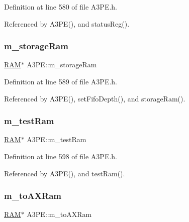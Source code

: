 Definition at line 580 of file A3\+P\+E.\+h.



Referenced by A3\+P\+E(), and status\+Reg().

\mbox{\label{classA3PE_a41e317474e0c6e63bad4648903279be9}} 
\subsubsection{\texorpdfstring{m\+\_\+storage\+Ram}{m\_storageRam}}
{\footnotesize\ttfamily \hyperlink{classRAM}{R\+AM}$\ast$ A3\+P\+E\+::m\+\_\+storage\+Ram\hspace{0.3cm}{\ttfamily [private]}}



Definition at line 589 of file A3\+P\+E.\+h.



Referenced by A3\+P\+E(), set\+Fifo\+Depth(), and storage\+Ram().

\mbox{\label{classA3PE_ad788e41ef5c674ab1a7671f3db0ffef6}} 
\subsubsection{\texorpdfstring{m\+\_\+test\+Ram}{m\_testRam}}
{\footnotesize\ttfamily \hyperlink{classRAM}{R\+AM}$\ast$ A3\+P\+E\+::m\+\_\+test\+Ram\hspace{0.3cm}{\ttfamily [private]}}



Definition at line 598 of file A3\+P\+E.\+h.



Referenced by A3\+P\+E(), and test\+Ram().

\mbox{\label{classA3PE_ae586a3d2fd21556e84e1af656e3430b5}} 
\subsubsection{\texorpdfstring{m\+\_\+to\+A\+X\+Ram}{m\_toAXRam}}
{\footnotesize\ttfamily \hyperlink{classRAM}{R\+AM}$\ast$ A3\+P\+E\+::m\+\_\+to\+A\+X\+Ram\hspace{0.3cm}{\ttfamily [private]}}



